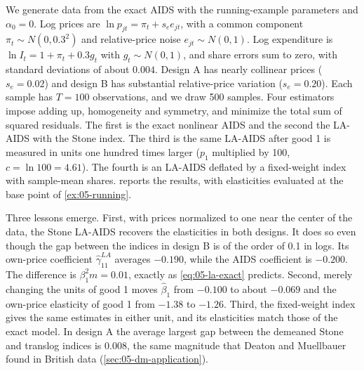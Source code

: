 \begin{example}\label{ex:05-stone-mc}
We generate data from the exact AIDS with the running-example parameters and $\alpha_0 = 0$. Log prices
are $\ln p_{jt} = \pi_t + s_e e_{jt}$, with a common component $\pi_t \sim N(0, 0.3^2)$ and relative-price
noise $e_{jt} \sim N(0,1)$. Log expenditure is $\ln I_t = 1 + \pi_t + 0.3g_t$ with $g_t \sim N(0,1)$, and
share errors sum to zero, with standard deviations of about $0.004$. Design A has nearly collinear prices
($s_e = 0.02$) and design B has substantial relative-price variation ($s_e = 0.20$). Each sample has $T =
100$ observations, and we draw 500 samples. Four estimators impose adding up, homogeneity and symmetry,
and minimize the total sum of squared residuals. The first is the exact nonlinear AIDS and the second the
LA-AIDS with the Stone index. The third is the same LA-AIDS after good 1 is measured in units one hundred
times larger ($p_1$ multiplied by 100, $c = \ln 100 = 4.61$). The fourth is an LA-AIDS deflated by a fixed-weight index with
sample-mean shares. 
reports the results, with elasticities evaluated at the base point of \cref{ex:05-running}.

Three lessons emerge. First, with prices normalized to one near the center of the data, the Stone LA-AIDS
recovers the elasticities in both designs. It does so even though the gap between the indices in design B
is of the order of 0.1 in logs. Its own-price coefficient $\hat\gamma_{11}^{LA}$ averages $-0.190$, while
the AIDS coefficient is $-0.200$. The difference is $\beta_1^2 m = 0.01$, exactly as
\eqref{eq:05-la-exact} predicts. Second, merely changing the units of
good 1 moves $\hat\beta_1$ from $-0.100$ to about $-0.069$ and the own-price elasticity of good 1 from
$-1.38$ to $-1.26$. Third, the fixed-weight index gives the same estimates in either unit, and its
elasticities match those of the exact model. In design A the average largest gap between the demeaned Stone and translog indices is
0.008, the same magnitude that Deaton and Muellbauer found in British data (\cref{sec:05-dm-application}).
\end{example}

